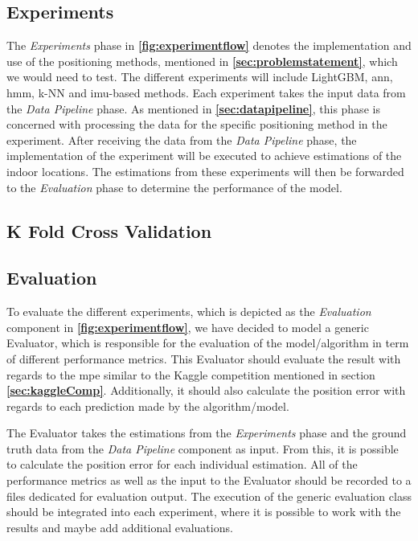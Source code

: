 \subsection{Experiments}
The \textit{Experiments} phase in \textbf{\autoref{fig:experimentflow}} denotes the implementation and use of the positioning methods, mentioned in \textbf{\autoref{sec:problemstatement}}, which we would need to test. The different experiments will include LightGBM, \gls{ann}, \gls{hmm}, k-NN and \gls{imu}-based methods. Each experiment takes the input data from the \textit{Data Pipeline} phase. As mentioned in \textbf{\autoref{sec:datapipeline}}, this phase is concerned with processing the data for the specific positioning method in the experiment. After receiving the data from the \textit{Data Pipeline} phase, the implementation of the experiment will be executed to achieve estimations of the indoor locations. The estimations from these experiments will then be forwarded to the \textit{Evaluation} phase to determine the performance of the model.
%

\subsection{K Fold Cross Validation}

\subsection{Evaluation}
To evaluate the different experiments, which is depicted as the \textit{Evaluation} component in \textbf{\autoref{fig:experimentflow}}, we have decided to model a generic Evaluator, which is responsible for the evaluation of the model/algorithm in term of different performance metrics.
This Evaluator should evaluate the result with regards to the \gls{mpe} similar to the Kaggle competition mentioned in section \textbf{\autoref{sec:kaggleComp}}. Additionally, it should also calculate the position error with regards to each prediction made by the algorithm/model.

The Evaluator takes the estimations from the \textit{Experiments} phase and the ground truth data from the \textit{Data Pipeline} component as input. From this, it is possible to calculate the position error for each individual estimation. All of the performance metrics as well as the input to the Evaluator should be recorded to a files dedicated for evaluation output. The execution of the generic evaluation class should be integrated into each experiment, where it is possible to work with the results and maybe add additional evaluations.

